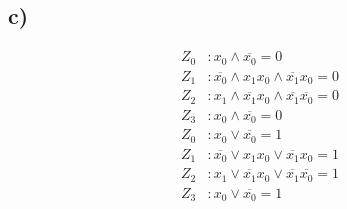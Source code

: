 \documentclass[a4paper]{scrartcl}
\begin{document}
	\subsection{c)}
		\begin{align}
			Z_0&: x_0\wedge \overline{x_0}=0 \\
			Z_1&: \overline{x_0} \wedge x_1x_0 \wedge \overline{x_1}x_0 =0  \\
			Z_2&: x_1\wedge\overline{x_1}x_0\wedge \overline{x_1}\overline{x_0}=0 \\
			Z_3&: x_0\wedge \overline{x_0}=0
		\end{align}
		\begin{align}
			Z_0&: x_0\vee \overline{x_0}=1 \\
			Z_1&: \overline{x_0} \vee x_1x_0 \vee \overline{x_1}x_0 =1  \\
			Z_2&: x_1\vee\overline{x_1}x_0\vee \overline{x_1}\overline{x_0}=1 \\
			Z_3&: x_0\vee \overline{x_0}=1
		\end{align}
\end{document}
